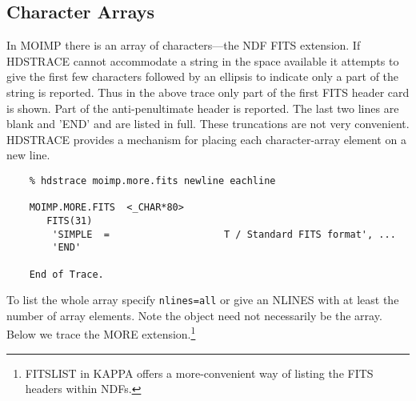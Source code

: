 \subsection{Character Arrays}

In MOIMP there is an array of characters---the NDF FITS extension. If
{\footnotesize HDSTRACE} cannot accommodate a string in the space
available it attempts to give the first few characters followed by an
ellipsis to indicate only a part of the string is reported.  Thus in the
above trace only part of the first FITS header card is shown.  Part of
the anti-penultimate header is reported.  The last two lines are blank
and 'END' and are listed in full.  These truncations are not very
convenient. {\footnotesize HDSTRACE} provides a mechanism for placing
each character-array element on a new line. 

\small
\begin{verbatim}
    % hdstrace moimp.more.fits newline eachline

    MOIMP.MORE.FITS  <_CHAR*80>
       FITS(31)  
        'SIMPLE  =                    T / Standard FITS format', ...
        'END'

    End of Trace.
\end{verbatim}
\normalsize
To list the whole array specify {\tt nlines=all} or give an NLINES with at 
least the number of array elements.  Note the object need not 
necessarily be the array.  Below we trace the MORE extension.\footnote{
FITSLIST in {\footnotesize KAPPA} offers a more-convenient way of listing the
FITS headers within NDFs.}


